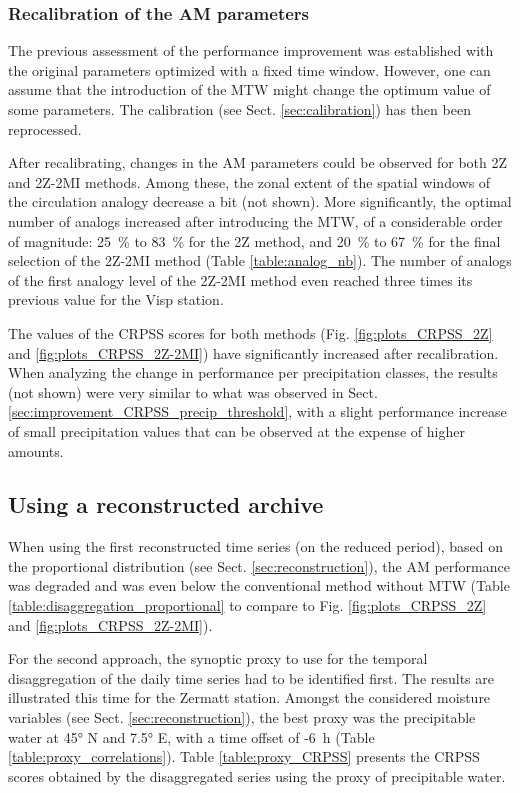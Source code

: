 \documentclass[hess, manuscript]{copernicus}
\begin{document}
\subsubsection{Recalibration of the AM parameters}
\label{sec:recalibration}

The previous assessment of the performance improvement was established with the original parameters optimized with a fixed time window. However, one can assume that the introduction of the MTW might change the optimum value of some parameters. The calibration (see Sect. \ref{sec:calibration}) has then been reprocessed.

After recalibrating, changes in the AM parameters could be observed for both 2Z and 2Z-2MI methods. Among these, the zonal extent of the spatial windows of the circulation analogy decrease a bit (not shown). More significantly, the optimal number of analogs increased after introducing the MTW, of a considerable order of magnitude: 25~\% to 83~\% for the 2Z method, and 20~\% to 67~\% for the final selection of the 2Z-2MI method (Table \ref{table:analog_nb}). The number of analogs of the first analogy level of the 2Z-2MI method even reached three times its previous value for the Visp station. 

The values of the CRPSS scores for both methods (Fig. \ref{fig:plots_CRPSS_2Z} and \ref{fig:plots_CRPSS_2Z-2MI}) have significantly increased after recalibration. When analyzing the change in performance per precipitation classes, the results (not shown) were very similar to what was observed in Sect. \ref{sec:improvement_CRPSS_precip_threshold}, with a slight performance increase of small precipitation values that can be observed at the expense of higher amounts.


\subsection{Using a reconstructed archive}
\label{sec:reconstruction_results}

When using the first reconstructed time series (on the reduced period), based on the proportional distribution (see Sect. \ref{sec:reconstruction}), the AM performance was degraded and was even below the conventional method without MTW (Table \ref{table:disaggregation_proportional} to compare to Fig. \ref{fig:plots_CRPSS_2Z} and \ref{fig:plots_CRPSS_2Z-2MI}).

For the second approach, the synoptic proxy to use for the temporal disaggregation of the daily time series had to be identified first. The results are illustrated this time for the Zermatt station. Amongst the considered moisture variables (see Sect. \ref{sec:reconstruction}), the best proxy was the precipitable water at 45° N and 7.5° E, with a time offset of -6~h (Table \ref{table:proxy_correlations}). Table \ref{table:proxy_CRPSS} presents the CRPSS scores obtained by the disaggregated series using the proxy of precipitable water.
\end{document}
